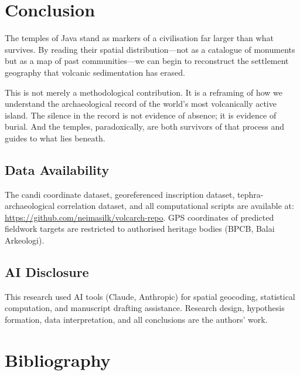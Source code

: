 \documentclass[12pt,a4paper]{article}
\begin{document}
\section{Conclusion}

The temples of Java stand as markers of a civilisation far larger than what survives. By reading their spatial distribution---not as a catalogue of monuments but as a map of past communities---we can begin to reconstruct the settlement geography that volcanic sedimentation has erased.

This is not merely a methodological contribution. It is a reframing of how we understand the archaeological record of the world's most volcanically active island. The silence in the record is not evidence of absence; it is evidence of burial. And the temples, paradoxically, are both survivors of that process and guides to what lies beneath.

\subsection*{Data Availability}

The candi coordinate dataset, georeferenced inscription dataset, tephra-archaeological correlation dataset, and all computational scripts are available at: \url{https://github.com/neimasilk/volcarch-repo}. GPS coordinates of predicted fieldwork targets are restricted to authorised heritage bodies (BPCB, Balai Arkeologi).

\subsection*{AI Disclosure}

This research used AI tools (Claude, Anthropic) for spatial geocoding, statistical computation, and manuscript drafting assistance. Research design, hypothesis formation, data interpretation, and all conclusions are the authors' work.

\section*{Bibliography}
\end{document}

